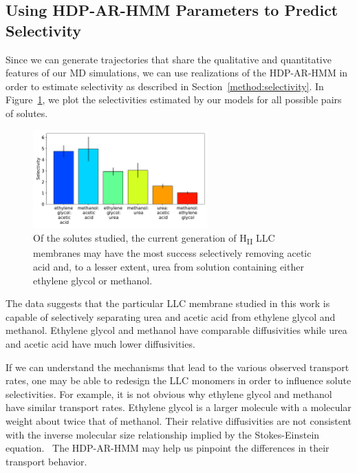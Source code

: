 \documentclass[journal=jpcbfk,manuscript=article]{achemso}
\begin{document}
  \subsection{Using HDP-AR-HMM Parameters to Predict Selectivity}\label{section:macroscopic_properties}
  

  Since we can generate trajectories that share the qualitative and quantitative
  features of our MD simulations, we can use realizations of the HDP-AR-HMM
  in order to estimate selectivity as described in Section~\ref{method:selectivity}.
  In Figure~\ref{fig:selectivity}, we plot the selectivities estimated by our
  models for all possible pairs of solutes.
  
  \begin{figure}
  \centering
  \includegraphics[width=0.6\textwidth]{selectivity.pdf}
  \caption{Of the solutes studied, the current generation of H\textsubscript{II}
  LLC membranes may have the most success selectively removing acetic acid and,
  to a lesser extent, urea from solution containing either ethylene glycol or 
  methanol.
  }\label{fig:selectivity}
  \end{figure}
  
  The data suggests that the particular LLC membrane studied in this work is
  capable of selectively separating urea and acetic acid from ethylene glycol
  and methanol. Ethylene glycol and methanol have comparable diffusivities
  while urea and acetic acid have much lower diffusivities. 

  If we can understand the mechanisms that lead to the various observed transport
  rates, one may be able to redesign the LLC monomers in order to influence solute
  selectivities. For example, it is not obvious why ethylene glycol and methanol
  have similar transport rates. Ethylene glycol is a larger molecule with a 
  molecular weight about twice that of methanol. Their relative diffusivities are 
  not consistent with the inverse molecular size relationship implied by the 
  Stokes-Einstein equation.~\cite{gierer_molekulare_1953} The HDP-AR-HMM may 
  help us pinpoint the differences in their transport behavior.
  
\end{document}
